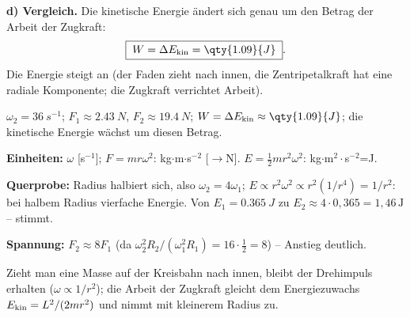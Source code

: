 \textbf{d) Vergleich.} Die kinetische Energie ändert sich genau um den
Betrag der Arbeit der Zugkraft:
\begin{equation}
  \boxed{\;W=\Delta E_{\rm kin}=\qty{1.09}{J}\;}.
\end{equation}
Die Energie steigt an (der Faden zieht nach innen, die Zentripetalkraft
hat eine radiale Komponente; die Zugkraft verrichtet Arbeit).

\begin{ergebnis}
$\omega_2=\qty{36}{s^{-1}}$; $F_1\approx\qty{2.43}{N}$,
$F_2\approx\qty{19.4}{N}$; $W=\Delta E_{\rm kin}\approx\qty{1.09}{J}$;
die kinetische Energie wächst um diesen Betrag.
\end{ergebnis}

\begin{kontrolle}
\textbf{Einheiten:} $\omega$ [s$^{-1}$]; $F=mr\omega^2$: kg$\cdot$m$\cdot$s$^{-2}$
[$\rightarrow$N]. $E=\tfrac12mr^2\omega^2$: kg$\cdot$m$^2\cdot$s$^{-2}$=J. \checkmark

\textbf{Querprobe:} Radius halbiert sich, also $\omega_2=4\omega_1$;
$E\propto r^2\omega^2\propto r^2(1/r^4)=1/r^2$: bei halbem Radius vierfache
Energie. Von $E_1=\qty{0.365}{J}$ zu $E_2\approx4\cdot0{,}365=1{,}46\,\mathrm J$ --
stimmt. \checkmark

\textbf{Spannung:} $F_2\approx8F_1$ (da $\omega_2^2R_2/(\omega_1^2R_1)
=16\cdot\frac12=8$) -- Anstieg deutlich. \checkmark
\end{kontrolle}

\begin{merksatz}
Zieht man eine Masse auf der Kreisbahn nach innen, bleibt der Drehimpuls
erhalten ($\omega\propto1/r^2$); die Arbeit der Zugkraft gleicht dem
Energiezuwachs $E_{\rm kin}=L^2/(2mr^2)$ und nimmt mit kleinerem Radius zu.
\end{merksatz}
